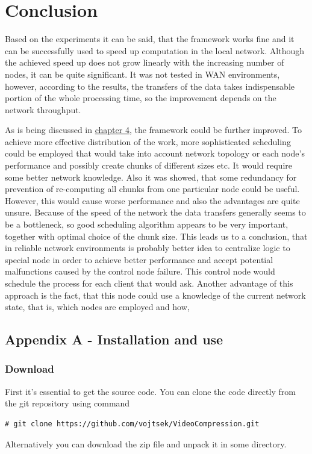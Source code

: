 \chapter*{Conclusion}
Based on the experiments it can be said, that the framework works fine and it can be successfully used to speed up computation in the local network. Although the achieved speed up does not grow linearly with the increasing number of nodes, it can be quite significant. It was not tested in WAN environments, however, according to the results, the transfers of the data takes indispensable portion of the whole processing time, so the improvement depends on the network throughput. 

As is being discussed in \hyperref[Problems-alternatives-and-possible-improvements]{chapter 4}, the framework could be further improved. To achieve more effective distribution of the work, more sophisticated scheduling could be employed that would take into account network topology or each node's performance and possibly create chunks of different sizes etc. It would require some better network knowledge. Also it was showed, that some redundancy for prevention of re-computing all chunks from one particular node could be useful. However, this would cause worse performance and also the advantages are quite unsure. Because of the speed of the network the data transfers generally seems to be a bottleneck, so good scheduling algorithm appears to be very important, together with optimal choice of the chunk size. This leads us to a conclusion, that in reliable network environments is probably better idea to centralize logic to special node in order to achieve better performance and accept potential malfunctions caused by the control node failure. This control node would schedule the process for each client that would ask. Another advantage of this approach is the fact, that this node could use a knowledge of the current network state, that is, which nodes are employed and how,

\section{Appendix A - Installation and use}
\subsection{Download} 
First it's essential to get the source code. You can clone the code directly from the git repository using command
\begin{verbatim}
# git clone https://github.com/vojtsek/VideoCompression.git
\end{verbatim}
Alternatively you can download the zip file and unpack it in some directory.

